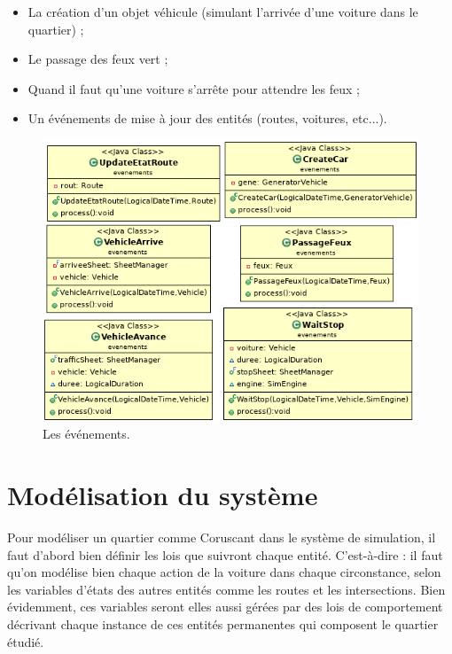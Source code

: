 \documentclass[12pt]{article} %
\begin{document}
\begin{itemize}
\item La création d'un objet véhicule (simulant l'arrivée d'une voiture dans le quartier) ;\\

\item Le passage des feux vert ;\\

\item Quand il faut qu'une voiture s'arrête pour attendre les feux ;\\

\item Un événements de mise à jour des entités (routes, voitures, etc...).
\end{itemize}

\begin{figure}[H]
	\centering
	\includegraphics[width=0.9\linewidth]{UML_evenements.png}
	\caption{Les événements.}
	\label{fig:UML_evenements}
\end{figure}

\newpage
\section{Modélisation du système}\label{modelisation}
Pour modéliser un quartier comme Coruscant dans le système de simulation, il faut d'abord bien définir les lois que suivront chaque entité. C'est-à-dire : il faut qu'on modélise bien chaque action de la voiture dans chaque circonstance, selon les variables d'états des autres entités comme les routes et les intersections. Bien évidemment, ces variables seront elles aussi gérées par des lois de comportement décrivant chaque instance de ces entités permanentes qui composent le quartier étudié.
%
\end{document}
